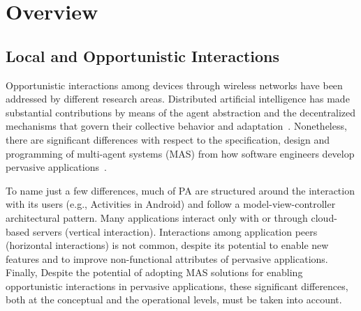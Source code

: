 \section{Overview}\label{sec:overview}

\subsection{Local and Opportunistic Interactions}

Opportunistic interactions among devices through wireless networks have been addressed by different research areas. Distributed artificial intelligence has made substantial contributions by means of the agent abstraction and the decentralized mechanisms that govern their collective behavior and adaptation~\cite{}. Nonetheless, there are significant differences with respect to the specification, design and programming of multi-agent systems (MAS) from how software engineers develop pervasive applications~\cite{}. 

To name just a few differences, much of PA are structured around the interaction with its users (e.g., Activities in Android) and follow a model-view-controller architectural pattern. Many applications interact only with or through cloud-based servers (vertical interaction). Interactions among application peers (horizontal interactions) is not common, despite its potential to enable new features and to improve non-functional attributes of pervasive applications. Finally, %
Despite the potential of adopting MAS solutions for enabling opportunistic interactions in pervasive applications, these significant differences, both at the conceptual and the operational levels, must be taken into account.



